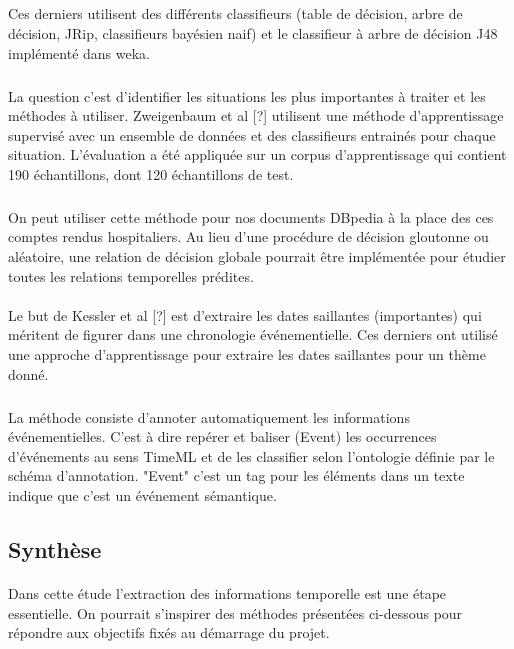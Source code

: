\subparagraph{}
Ces derniers utilisent des différents classifieurs (table de décision, arbre de décision, JRip, classifieurs bayésien naif) et le classifieur à arbre de décision J48 implémenté dans weka.
\subparagraph{}
La question c’est d’identifier les situations les plus importantes à traiter et les méthodes à utiliser.
Zweigenbaum et al%
[?] utilisent une méthode d’apprentissage supervisé avec un ensemble de données et des classifieurs entrainés pour chaque situation. 
L'évaluation a été appliquée sur un corpus d’apprentissage qui contient 190 échantillons, dont 120 échantillons de test.
\subparagraph{}
On peut utiliser cette méthode pour nos documents DBpedia à la place des ces comptes rendus hospitaliers.
Au lieu d’une procédure de décision gloutonne ou aléatoire, une relation de décision globale pourrait être implémentée pour étudier toutes les relations temporelles prédites. 
\paragraph{}
Le but de Kessler et al%
[?] est d'extraire les dates saillantes (importantes) qui méritent de figurer dans une chronologie événementielle.
Ces derniers ont utilisé une approche d’apprentissage pour extraire les dates saillantes pour un thème donné.
\subparagraph{}
La méthode consiste d'annoter automatiquement les informations événementielles. 
C’est à dire repérer et baliser (Event) les occurrences d’événements au sens TimeML et de les classifier selon l’ontologie définie par le schéma d’annotation. 
\newline
"Event" c’est un tag pour les éléments dans un texte indique que c’est un événement sémantique.
\subsection*{Synthèse}
\paragraph{}
Dans cette étude l'extraction des informations temporelle est une étape essentielle. On pourrait s'inspirer des méthodes présentées ci-dessous pour répondre aux objectifs fixés au démarrage du projet.

